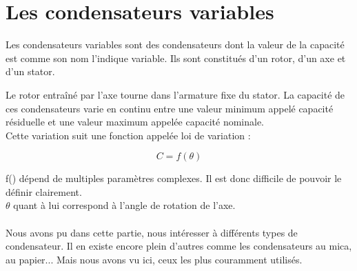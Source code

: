 \section{Les condensateurs variables}

Les condensateurs variables sont des condensateurs dont la valeur de la capacité est comme son nom l’indique variable. Ils sont constitués d’un rotor, d’un axe et d’un stator. 




Le rotor entraîné par l’axe tourne dans l’armature fixe du stator. La capacité de ces condensateurs varie en continu entre une valeur minimum appelé capacité résiduelle et une valeur maximum appelée capacité nominale. \\

Cette variation suit une fonction appelée loi de variation : 

$$ C=f(\theta) $$


f() dépend de multiples paramètres complexes. Il est donc difficile de pouvoir le définir clairement.\\
$\theta$ quant à lui correspond à l'angle de rotation de l'axe. \\ \\

Nous avons pu dans cette partie, nous intéresser à différents types de condensateur. Il en existe encore plein d'autres comme les condensateurs au mica, au papier... Mais nous avons vu ici, ceux les plus couramment utilisés.

